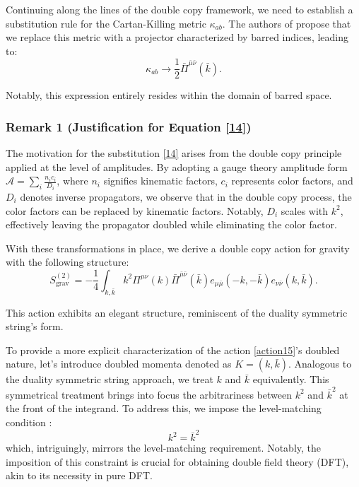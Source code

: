 \documentclass[13pt]{article}
\begin{document}
Continuing along the lines of the double copy framework, we need to establish a substitution rule for the Cartan-Killing metric $\kappa_{ab}$. The authors of \cite{D_az_Jaramillo_2022} propose that we replace this metric with a projector characterized by barred indices, leading to:
\begin{equation}
\kappa_{ab} \rightarrow \frac{1}{2} \bar{\Pi}^{\bar{\mu} \bar{\nu}}(\bar{k}). \tag{14}
\label{14}
\end{equation}

Notably, this expression entirely resides within the domain of barred space.

\subsubsection*{Remark 1 (Justification for Equation \eqref{14})}
The motivation for the substitution \eqref{14} arises from the double copy principle applied at the level of amplitudes. By adopting a gauge theory amplitude form $\mathcal{A} = \sum_i \frac{n_i c_i}{D_i}$, where $n_i$ signifies kinematic factors, $c_i$ represents color factors, and $D_i$ denotes inverse propagators, we observe that in the double copy process, the color factors can be replaced by kinematic factors. Notably, $D_i$ scales with $k^2$, effectively leaving the propagator doubled while eliminating the color factor.

With these transformations in place, we derive a double copy action for gravity with the following structure:
\begin{equation}
S_{\text{grav}}^{(2)} = - \frac{1}{4} \int_{k, \bar{k}} k^2 \Pi^{\mu \nu}(k) \bar{\Pi}^{\bar{\mu}\bar{\nu}}(\bar{k}) e_{\mu \bar{\mu}}(-k, -\bar{k})e_{\nu \bar{\nu}}(k, \bar{k}). \tag{15}
\label{action15}
\end{equation}

This action exhibits an elegant structure, reminiscent of the duality symmetric string's form.

To provide a more explicit characterization of the action \eqref{action15}'s doubled nature, let's introduce doubled momenta denoted as $K = (k, \bar{k})$. Analogous to the duality symmetric string approach, we treat $k$ and $\bar{k}$ equivalently. This symmetrical treatment brings into focus the arbitrariness between $k^2$ and $\bar{k}^2$ at the front of the integrand. To address this, we impose the level-matching condition \cite{hull2009double,hull2009gauge,hohm2010background,hohm2010generalized}:
\begin{equation}
k^2 = \bar{k}^2 \tag{16}
\label{level matching}
\end{equation}
which, intriguingly, mirrors the level-matching requirement. Notably, the imposition of this constraint is crucial for obtaining double field theory (DFT), akin to its necessity in pure DFT.
\end{document}
